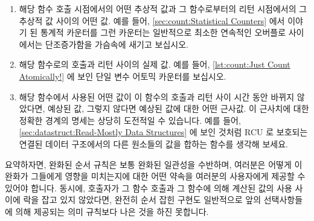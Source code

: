 \begin{enumerate}
\item	해당 함수 호출 시점에서의 어떤 추상적 값과 그 함수로부터의 리턴
	시점에서의 그 추상적 값 사이의 어떤 값.
	예를 들어,
	\cref{sec:count:Statistical Counters} 에서 이야기 된 통계적 카운터를
	그런 카운터는 일반적으로 최소한 연속적인 오버플로 사이에서는
	단조증가함을 가슴속에 새기고 보십시오.
\item	해당 함수로의 호출과 리턴 사이의 실제 값.
	예를 들어,
	\cref{lst:count:Just Count Atomically!} 에 보인 단일 변수 어토믹
	카운터를 보십시오.
\item	해당 함수에서 사용된 어떤 값이 이 함수의 호출과 리턴 사이 시간 동안
	바뀌지 않았다면, 예상된 값, 그렇지 않다면 예상된 값에 대한 어떤 근사값.
	이 근사치에 대한 정확한 경계의 명세는 상당히 도전적일 수 있습니다.
	예를 들어,
	\cref{sec:datastruct:Read-Mostly Data Structures} 에 보인 것처럼 RCU 로
	보호되는 연결된 데이터 구조에서의 다른 원소들의 값을 합하는 함수를
	생각해 보세요.

\iffalse

\item	Some value between the conceptual value at the time of the call
	to the function and the conceptual value at the time of the
	return from that function.
	For example, see the statistical counters discussed in
	\cref{sec:count:Statistical Counters}, keeping in mind that such
	counters are normally monotonic, at least between consecutive
	overflows.
\item	The actual value at some time between the call to and the return
	from that function.
	For example, see the single-variable atomic counter shown in
	\cref{lst:count:Just Count Atomically!}.
\item	If the values used by that function remain unchanged during the
	time between that function's call and return, the expected
	value, otherwise some approximation to the expected value.
	Precise specification of the bounds on the approximation can
	be quite challenging.
	For example, consider a function combining values from
	different elements of an RCU-protected linked data structure,
	as described in \cref{sec:datastruct:Read-Mostly Data Structures}.

\fi

\end{enumerate}

요약하자면, 완화된 순서 규칙은 보통 완화된 일관성을 수반하며, 여러분은 어떻게
이 완화가 그들에게 영향을 미치는지에 대한 어떤 약속을 여러분의 사용자에게
제공할 수 있어야 합니다.
동시에, 호출자가 그 함수 호출과 그 함수에 의해 계산된 값의 사용 사이에 락을
잡고 있지 않았다면, 완전히 순서 잡힌 구현도 일반적으로 앞의 선택사항들에 의해
제공되는 의미 규칙보다 나은 것을 하진 못합니다.

